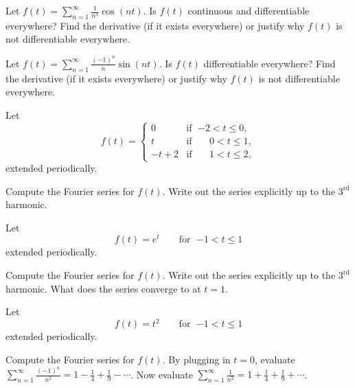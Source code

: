 \begin{exercise}
Let $f(t) = \sum_{n=1}^\infty \frac{1}{n^3} \cos (n t)$.  Is $f(t)$
continuous and differentiable everywhere?  Find the derivative (if it exists
everywhere)
or justify why $f(t)$ is not differentiable everywhere.
\end{exercise}

\begin{exercise}
Let $f(t) = \sum_{n=1}^\infty \frac{{(-1)}^n}{n} \sin (n t)$.  Is $f(t)$
differentiable everywhere?  Find the derivative (if it exists everywhere) or
justify why $f(t)$ is not differentiable everywhere.
\end{exercise}

\begin{exercise}
Let
\begin{equation*}
f(t) =
\begin{cases}
0 & \text{if } \; {-2} < t \leq 0, \\
t & \text{if } \; \phantom{-}0 < t \leq 1, \\
-t+2 & \text{if } \; \phantom{-}1 < t \leq 2,
\end{cases}
\end{equation*}
extended periodically.
\begin{tasks}
\task Compute the Fourier series for $f(t)$.
\task Write out the series explicitly up to the $3^{\text{rd}}$ harmonic.
\end{tasks}
\end{exercise}

\begin{exercise}
Let
\begin{equation*}
f(t) = e^t \qquad \text{for } \; {-1} < t \leq 1
\end{equation*}
extended periodically.
\begin{tasks}
\task Compute the Fourier series for $f(t)$.
\task Write out the series explicitly up to the $3^{\text{rd}}$ harmonic.
\task What does the series converge to at $t=1$.
\end{tasks}
\end{exercise}

\begin{exercise}
\pagebreak[2]
Let
\begin{equation*}
f(t) = t^2 \qquad \text{for } \; {-1} < t \leq 1
\end{equation*}
extended periodically.
\begin{tasks}
\task Compute the Fourier series for $f(t)$.
\task By plugging in $t=0$,
evaluate $\displaystyle \sum_{n=1}^\infty \frac{{(-1)}^n}{n^2} = 1 - \frac{1}{4} +
\frac{1}{9} - \cdots$.
\task Now evaluate $\displaystyle \sum_{n=1}^\infty \frac{1}{n^2} = 1 + \frac{1}{4} +
\frac{1}{9} + \cdots$.
\end{tasks}
\end{exercise}

